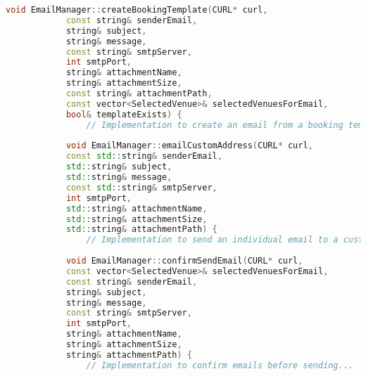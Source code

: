 \documentclass{article}
\begin{document}
\begin{mdframed}[backgroundcolor=background, hidealllines=false, innerleftmargin=15pt, innerrightmargin=5pt, innertopmargin=0pt, innerbottommargin=-5pt, linecolor=accent]
\begin{lstlisting}[language=C++]
			void EmailManager::createBookingTemplate(CURL* curl,
			const string& senderEmail,
			string& subject,
			string& message,
			const string& smtpServer,
			int smtpPort,
			string& attachmentName,
			string& attachmentSize,
			const string& attachmentPath,
			const vector<SelectedVenue>& selectedVenuesForEmail,
			bool& templateExists) {
				// Implementation to create an email from a booking template...
				
			void EmailManager::emailCustomAddress(CURL* curl,
			const std::string& senderEmail,
			std::string& subject,
			std::string& message,
			const std::string& smtpServer,
			int smtpPort,
			std::string& attachmentName,
			std::string& attachmentSize,
			std::string& attachmentPath) {
				// Implementation to send an individual email to a custom address...
				
			void EmailManager::confirmSendEmail(CURL* curl,
			const vector<SelectedVenue>& selectedVenuesForEmail,
			const string& senderEmail,
			string& subject,
			string& message,
			const string& smtpServer,
			int smtpPort,
			string& attachmentName,
			string& attachmentSize,
			string& attachmentPath) {
				// Implementation to confirm emails before sending...
															
		\end{lstlisting}
	\end{mdframed}
	
\end{document}
